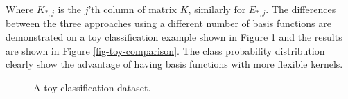 \documentclass[useAMS,usenatbib,fleqn]{mn2e}
\begin{document}
Where $K_{*,j}$ is the $j$'th column of matrix $K$, similarly for $E_{*,j}$. The differences between the three approaches using a different number of basis functions are demonstrated on a toy classification example shown in Figure \ref{fig-toy-example} and the results are shown in Figure \ref{fig-toy-comparison}. The class probability distribution clearly show the advantage of having basis functions with more flexible kernels. 

\begin{figure}
       \centering
        \caption{A toy classification dataset. }       
       \label{fig-toy-example}
\end{figure}
  
\end{document}

